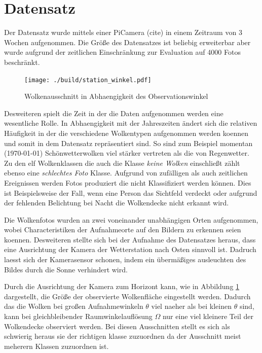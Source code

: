 \section{Datensatz}
\label{sec:02_Datensatz}

Der Datensatz wurde mittels einer PiCamera (cite) in einem Zeitraum von 3 Wochen
aufgenommen. 
Die Größe des Datensatzes ist beliebig erweiterbar aber wurde aufgrund der
zeitlichen Einschränkung zur Evaluation auf \num{4000} Fotos beschränkt. 

\begin{figure}
		\centering
		\vspace{-0.5cm}
		\texttt{[image: ./build/station\_winkel.pdf]}
		\caption{Wolkenausschnitt in Abhaengigkeit des Observationswinkel}
		\label{fig:theta}
		\vspace{-0.5cm}
\end{figure}
Desweiteren spielt die Zeit in der die Daten aufgenommen werden eine 
wesentliche Rolle.
In Abhaengigkeit mit der Jahreszeiten ändert sich die relativen Häufigkeit in 
der die verschiedene Wolkentypen aufgenommen werden koennen und somit in dem 
Datensatz repräsentiert sind. 
So sind zum Beispiel momentan (\today) Schönwetterwolken viel stärker vertreten
als die von Regenwetter. 
Zu den elf Wolkenklassen die auch die Klasse \textit{keine Wolken} einschließt 
zählt ebenso eine \textit{schlechtes Foto} Klasse. 
Aufgrund von zufälligen als auch zeitlichen Ereignissen werden Fotos produziert
die nicht Klassifiziert werden können.
Dies ist Beispielsweise der Fall, wenn eine Person das Sichtfeld verdeckt oder 
aufgrund der fehlenden Belichtung bei Nacht die Wolkendecke nicht erkannt wird.

Die Wolkenfotos wurden an zwei voneinander unabhängigen Orten aufgenommen, wobei
Characteristiken der Aufnahmeorte auf den Bildern zu erkennen seien koennen.
Desweiteren stellte sich bei der Aufnahme des Datensatzes heraus, dass eine
Ausrichtung der Kamera der Wetterstation nach Osten sinnvoll ist.
Dadruch laesst sich der Kamerasensor schonen, indem ein übermäßiges ausleuchten
 des Bildes durch die Sonne verhindert wird.

Durch die Ausrichtung der Kamera zum Horizont kann, wie in Abbildung
 \ref{fig:theta} dargestellt, die Größe der observierte Wolkenfläche 
eingestellt werden.
Dadurch das die Wolken bei großen Aufnahmewinkeln $\theta$ viel naeher als bei
kleinen $\theta$ sind, kann bei gleichbleibender Raumwinkelauflösung $\Omega$
nur eine viel kleinere Teil der Wolkendecke observiert werden.
Bei diesen Ausschnitten stellt es sich als schwierig heraus sie der richtigen
klasse zuzuordnen da der Ausschnitt meist meherern Klassen zuzuordnen ist. 

